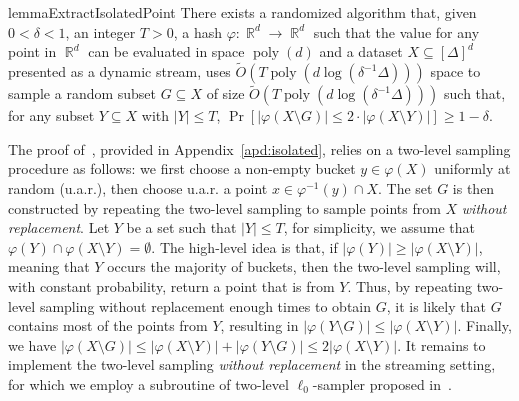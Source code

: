 \documentclass[letterpaper,11pt]{article}
\theoremstyle{plain}
\theoremstyle{definition}
\theoremstyle{remark}
\DeclareMathOperator{\R}{\mathbb{R}}
\DeclareMathOperator{\poly}{poly}
\renewcommand{\phi}{\varphi}
\begin{document}
\begin{restatable}{lemma}{ExtractIsolatedPoint}
    \label{lem:isolated}
    There exists a randomized algorithm that, given $0<\delta<1$, an integer $T >0$, a hash $\phi:\R^d\to\R^d$ such that the value for any point in $\R^d$ can be evaluated in space $\poly(d)$ and a dataset $X\subseteq [\Delta]^d$ presented as a dynamic stream, uses $\tilde O\left(T\poly(d\log(\delta^{-1}\Delta))\right)$ space to sample a random subset $G\subseteq X$ of size $\tilde O\left(T\poly(d\log(\delta^{-1}\Delta))\right)$ such that, for any subset $Y\subseteq X$ with $|Y|\le T$, $\Pr\left[|\phi(X\setminus G)|\le 2\cdot |\phi(X\setminus Y)|\right]\ge 1-\delta$.
\end{restatable}
The proof of~, provided in Appendix~\ref{apd:isolated}, relies on a two-level sampling procedure as follows:
we first choose a non-empty bucket $y\in \phi(X)$ uniformly at random (u.a.r.), then choose u.a.r. a point $x\in \phi^{-1}(y)\cap X$. 
The set $G$ is then constructed by repeating the two-level sampling to sample points from $X$ \emph{without replacement}.
Let $Y$ be a set such that $|Y|\le  T$, for simplicity, we assume that $\phi(Y)\cap \phi(X\setminus Y)=\emptyset$. 
The high-level idea is that, if $|\phi(Y)|\ge |\phi(X\setminus Y)|$, meaning that $Y$ occurs the majority of buckets, then the two-level sampling will, with constant probability, return a point that is from $Y$. 
Thus, by repeating two-level sampling without replacement enough times to obtain $G$, it is likely that $G$ contains most of the points from $Y$, resulting in $|\phi(Y\setminus G)|\le  |\phi(X\setminus Y)|$. 
Finally, we have $|\phi(X\setminus G) |\le |\phi(X\setminus Y)| + |\phi(Y\setminus G )|\le 2|\phi(X\setminus Y)|$. 
It remains to implement the two-level sampling \emph{without replacement} in the streaming setting, for which we employ a subroutine of two-level $\ell_0$-sampler proposed in~\cite[Lemma 3.3]{arxiv.2204.02095}.
\end{document}
